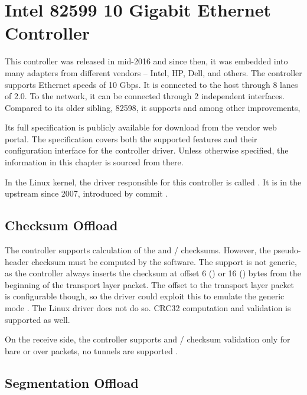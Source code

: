 \section{Intel 82599 10 Gigabit Ethernet Controller}
\label{nic:82599}
\renewcommand{\sect}[1]{\cite[#1]{82599}}

This controller was released in mid-2016 and since then, it was embedded into
many adapters from different vendors -- Intel, HP, Dell, and others. The
controller supports Ethernet speeds of 10 Gbps. It is connected to the host
through 8 lanes of  2.0. To the network, it can be connected through
2 independent interfaces. Compared to its older sibling, 82598, it supports
 and  among other improvements,

Its full specification \cite{82599} is publicly available for download from the
vendor web portal. The specification covers both the supported features and their
configuration interface for the controller driver. Unless otherwise specified,
the information in this chapter is sourced from there.

In the Linux kernel, the driver responsible for this controller is called
. It is in the upstream since 2007, introduced by commit
.

\subsection{Checksum Offload}

The controller supports calculation of the  and /
checksums. However, the pseudo-header checksum must be computed by the software. The
support is not generic, as the controller always inserts the checksum at offset
6 () or 16 () bytes from the beginning of the transport layer packet.
The offset to the transport layer packet is configurable though, so the driver
could exploit this to emulate the generic mode \sect{7.2.5}. The Linux driver
does not do so.  CRC32 computation and validation is supported as well.

On the receive side, the controller supports  and /
checksum validation only for bare  or  over  packets, no
tunnels are supported \sect{7.1.11}.

\subsection{Segmentation Offload}

